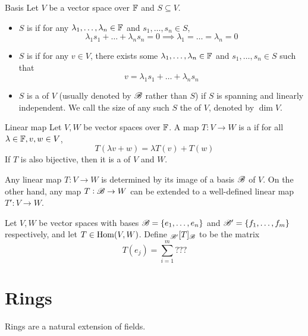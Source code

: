\documentclass{styles/tufte}
\begin{document}
\begin{definition}{Basis}{}
  Let $V$ be a vector space over $\mathbb{F}$ and $S \subseteq V$.
  \begin{itemize}
    \item $S$ is  if for any $\lambda_1, \dots, \lambda_n \in \mathbb{F}$ and $s_1, \dots, s_n \in S$,
      \[ \lambda_1 s_1 + \dots + \lambda_n s_n = 0 \implies \lambda_1 = \dots = \lambda_n = 0 \]
    \item $S$ is  if for any $v \in V$, there exists some $\lambda_1, \dots, \lambda_n \in \mathbb{F}$ and $s_1, \dots, s_n \in S$ such that
      \[ v = \lambda_1 s_1 + \dots + \lambda_n s_n \]
    \item $S$ is a  of $V$ (usually denoted by $\mathscr{B}$ rather than $S$) if $S$ is spanning and linearly independent. We call the size of any such $S$ the  of $V$, denoted by $\dim V$.
  \end{itemize}
\end{definition}

\begin{definition}{Linear map}{}
  Let $V, W$ be vector spaces over $\mathbb{F}$. A map $T: V \to W$ is a  if for all $\lambda \in \mathbb{F}, v, w \in V$,
  \[ T(\lambda v + w) = \lambda T(v) + T(w) \]
  If $T$ is also bijective, then it is a  of $V$ and $W$.
\end{definition}

Any linear map $T: V \to W$ is determined by its image of a basis $\mathscr{B}$ of $V$. On the other hand, any map $T: \mathscr{B} \to W$ can be extended to a well-defined linear map $T': V \to W$.

\begin{definition}{}{}
  Let $V, W$ be vector spaces with bases $\mathscr{B} = \set{e_1, \dots, e_n}$ and $\mathscr{B}' = \set{f_1, \dots, f_m}$ respectively, and let $T \in \operatorname{Hom}(V, W)$. Define ${}_{\mathscr{B}'}[T]_{\mathscr{B}}$ to be the  matrix
  \[ T(e_j) = \sum_{i = 1}^m ??? \]
\end{definition}



\section{Rings}

Rings are a natural extension of fields.
\end{document}
